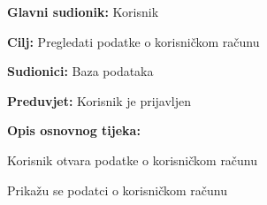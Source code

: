 \noindent {}
\begin{packed_item}
	
	\item \textbf{Glavni sudionik:} Korisnik
	\item \textbf{Cilj:} Pregledati podatke o korisničkom računu
	\item \textbf{Sudionici:} Baza podataka
	\item \textbf{Preduvjet:} Korisnik je prijavljen
	\item \textbf{Opis osnovnog tijeka:}
	
	\item[] \begin{packed_enum}
		
		\item Korisnik otvara podatke o korisničkom računu
		\item Prikažu se podatci o korisničkom računu
	
	\end{packed_enum}
	
\end{packed_item}

